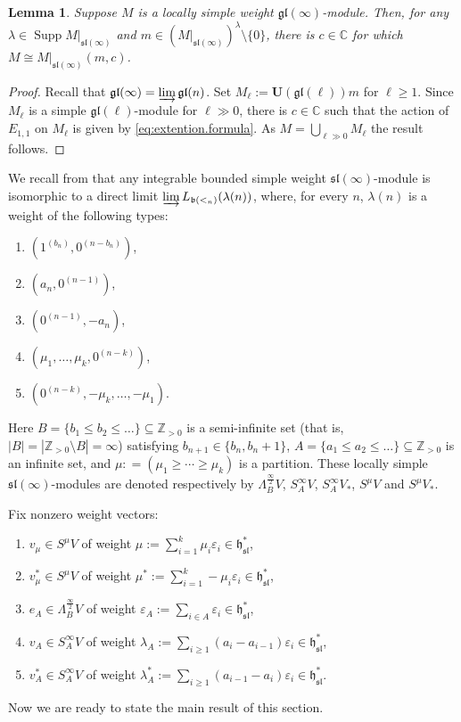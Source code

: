 \documentclass[12pt]{amsart}
\newcommand\C{\mathbb{C}}
\newcommand\Z{\mathbb{Z}}
\newcommand\fh{\mathfrak{h}}
\newcommand\fb{\mathfrak{b}}
\newcommand\fsl{\mathfrak{sl}}
\newcommand\fgl{\mathfrak{gl}}
\newcommand\bU{\mathbf{U}}
\DeclareMathOperator{\Supp}{Supp} %
\theoremstyle{plain}
\newtheorem{lem}[theo]{Lemma}
\theoremstyle{definition}
\numberwithin{equation}{section}
\begin{document}
\begin{lem}\label{lem:loc.simpl=M(c)}
Suppose $M$ is a locally simple weight $\fgl(\infty)$-module. Then, for any $\lambda\in \Supp M|_{\fsl(\infty)} $ and $m\in (M|_{\fsl(\infty)})^\lambda\setminus\{0\}$, there is $c\in \C$ for which $M\cong M|_{\fsl(\infty)} (m,c)$.
\end{lem}
\begin{proof}
Recall that $\fgl(\infty) = \varinjlim \fgl(n)$. Set $M_\ell := \bU(\fgl(\ell))m$ for $\ell\geq 1$. Since $M_\ell$ is a simple $\fgl(\ell)$-module for $\ell\gg 0$, there is $c\in \C$ such that the action of $E_{1,1}$ on $M_\ell$ is given by \eqref{eq:extention.formula}. As $M = \bigcup_{\ell \gg 0} M_\ell$ the result follows.
\end{proof}

We recall from \cite[Proposition~4.5]{GP20} that any integrable bounded simple weight $\fsl(\infty)$-module is isomorphic to a direct limit $\varinjlim L_{\fb(<_n)}(\lambda(n))$, where, for every $n$, $\lambda(n)$ is a weight of the following types:
\begin{enumerate}
\item  $(1^{(b_n)},0^{(n-b_n)})$,
\item $(a_n,0^{(n-1)})$, 
\item  $(0^{(n-1)}, -a_n)$, 
\item $(\mu_1,\ldots,\mu_k,0^{(n-k)})$, 
\item $(0^{(n-k)}, -\mu_k,\ldots,-\mu_1)$.
\end{enumerate}
Here $B = \{b_1\leq b_2\leq \ldots\} \subseteq \Z_{>0}$ is a semi-infinite set (that is, $|B|=|\Z_{>0}\setminus B|=\infty$) satisfying $b_{n+1}\in \{b_n, b_n+1\}$, $A=\{a_1\leq a_2\leq \ldots\} \subseteq \Z_{>0}$ is an infinite set, and $\mu : = (\mu_1\geq \cdots \geq \mu_k)$ is a partition. These locally simple $\fsl(\infty)$-modules are denoted respectively by $\Lambda_B^{\frac{\infty}{2}} V$, $S_A^\infty V$, $S_A^\infty V_*$, $S^\mu V$ and $S^\mu V_*$.

Fix nonzero weight vectors:
\begin{enumerate}
\item $v_\mu\in S^\mu V$ of weight $\mu := \sum_{i=1}^k \mu_i\varepsilon_i\in \fh_\fsl^*$,
\item $v_\mu^*\in S^\mu V$ of weight $\mu^* := \sum_{i=1}^{k}-\mu_i\varepsilon_{i} \in \fh_\fsl^*$,
\item $e_A \in \Lambda^{\frac{\infty}{2}}_B V$ of weight $\varepsilon_A := \sum_{i\in A}\varepsilon_i\in \fh_\fsl^*$,
\item $v_A \in S^\infty_A V$ of weight $\lambda_A := \sum_{i\geq 1}(a_i -a_{i-1})\varepsilon_i\in \fh_\fsl^*$,
\item $v_A^* \in S^\infty_A V$ of weight $\lambda_A^* := \sum_{i\geq 1}(a_{i-1} -a_{i})\varepsilon_i\in \fh_\fsl^*$.
\end{enumerate}
Now we are ready to state the main result of this section.
\end{document}
